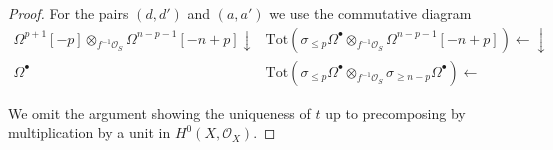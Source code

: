 \begin{proof}
\medskip\noindent
For the pairs $(d, d')$ and $(a, a')$ we use the commutative diagram
$$
\begin{array}{cc}\Omega^{p + 1}[-p] \otimes_{f^{-1}\mathcal{O}_S}
\Omega^{n - p - 1}[-n + p] \downarrow & \text{Tot}(\sigma_{\leq p}\Omega^\bullet \otimes_{f^{-1}\mathcal{O}_S}
\Omega^{n - p - 1}[-n + p]) \longleftarrow\downarrow \\ \Omega^\bullet & \text{Tot}(\sigma_{\leq p}\Omega^\bullet \otimes_{f^{-1}\mathcal{O}_S}
\sigma_{\geq n - p}\Omega^\bullet) \longleftarrow\end{array}
$$

\medskip\noindent
We omit the argument showing the uniqueness of $t$ up to
precomposing by multiplication by a unit in $H^0(X, \mathcal{O}_X)$.
\end{proof}



